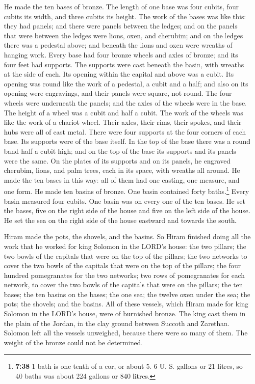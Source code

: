  He made the ten bases of bronze. The length of one base
was four cubits, four cubits its width, and three cubits its height.
 The work of the bases was like this: they had panels;
and there were panels between the ledges;  and on the
panels that were between the ledges were lions, oxen, and cherubim; and
on the ledges there was a pedestal above; and beneath the lions and oxen
were wreaths of hanging work.  Every base had four bronze
wheels and axles of bronze; and its four feet had supports. The supports
were cast beneath the basin, with wreaths at the side of each.
 Its opening within the capital and above was a cubit.
Its opening was round like the work of a pedestal, a cubit and a half;
and also on its opening were engravings, and their panels were square,
not round.  The four wheels were underneath the panels;
and the axles of the wheels were in the base. The height of a wheel was
a cubit and half a cubit.  The work of the wheels was
like the work of a chariot wheel. Their axles, their rims, their spokes,
and their hubs were all of cast metal.  There were four
supports at the four corners of each base. Its supports were of the base
itself.  In the top of the base there was a round band
half a cubit high; and on the top of the base its supports and its
panels were the same.  On the plates of its supports and
on its panels, he engraved cherubim, lions, and palm trees, each in its
space, with wreaths all around.  He made the ten bases in
this way: all of them had one casting, one measure, and one form.
 He made ten basins of bronze. One basin contained forty
baths.\footnote{\textbf{7:38} 1 bath is one tenth of a cor, or about 5.
  6 U. S. gallons or 21 litres, so 40 baths was about 224 gallons or 840
  litres.} Every basin measured four cubits. One basin was on every one
of the ten bases.  He set the bases, five on the right
side of the house and five on the left side of the house. He set the sea
on the right side of the house eastward and towards the south.

 Hiram made the pots, the shovels, and the basins. So
Hiram finished doing all the work that he worked for king Solomon in the
LORD's house:  the two pillars; the two bowls of the
capitals that were on the top of the pillars; the two networks to cover
the two bowls of the capitals that were on the top of the pillars;
 the four hundred pomegranates for the two networks; two
rows of pomegranates for each network, to cover the two bowls of the
capitals that were on the pillars;  the ten bases; the
ten basins on the bases;  the one sea; the twelve oxen
under the sea;  the pots; the shovels; and the basins.
All of these vessels, which Hiram made for king Solomon in the LORD's
house, were of burnished bronze.  The king cast them in
the plain of the Jordan, in the clay ground between Succoth and
Zarethan.  Solomon left all the vessels unweighed,
because there were so many of them. The weight of the bronze could not
be determined.

